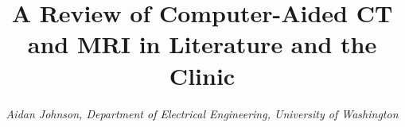 \documentclass{bmcart}
\begin{document}
\begin{frontmatter}



\title{A Review of Computer-Aided CT and MRI in Literature and the Clinic}


\author{\textit{Aidan Johnson, Department of Electrical Engineering, University of Washington}}








\end{frontmatter}
\end{document}
